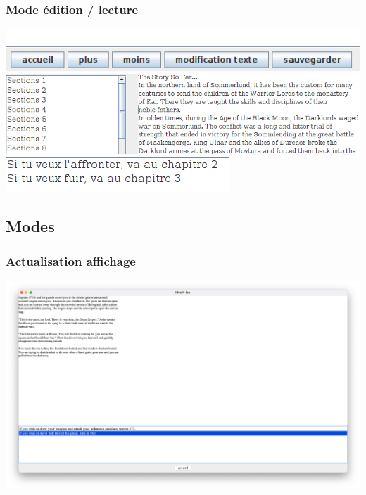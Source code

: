 \documentclass{beamer}
\begin{document}
\begin{frame}
\frametitle{Mode édition / lecture}

\begin{center}
\includegraphics[scale=0.4]{./images/boutonsEdition.png}\\
\vspace{0.6cm}
\includegraphics[scale=0.4]{./images/menu.png}\\
\vspace{0.6cm}
\includegraphics[scale=0.6]{./images/choix.png}
\end{center}

\end{frame}



\subsection{Modes}%

\begin{frame}
\frametitle{Actualisation affichage}
\includegraphics[scale=0.2]{./images/ChoixBug1.png}
\end{frame}
\end{document}

